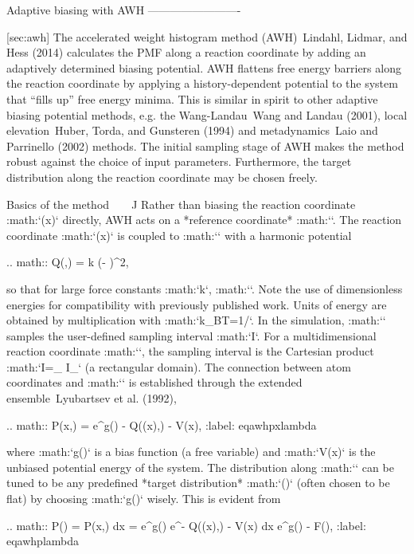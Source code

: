 Adaptive biasing with AWH
-------------------------

[sec:awh] The accelerated weight histogram method (AWH) Lindahl, Lidmar,
and Hess (2014) calculates the PMF along a reaction coordinate by adding
an adaptively determined biasing potential. AWH flattens free energy
barriers along the reaction coordinate by applying a history-dependent
potential to the system that “fills up” free energy minima. This is
similar in spirit to other adaptive biasing potential methods, e.g. the
Wang-Landau Wang and Landau (2001), local elevation Huber, Torda, and
Gunsteren (1994) and metadynamics Laio and Parrinello (2002) methods.
The initial sampling stage of AWH makes the method robust against the
choice of input parameters. Furthermore, the target distribution along
the reaction coordinate may be chosen freely.

Basics of the method
^^^^^^^^^^^^^^^^^^^^

Rather than biasing the reaction coordinate :math:`\xi(x)` directly, AWH
acts on a *reference coordinate* :math:`\lambda`. The reaction
coordinate :math:`\xi(x)` is coupled to :math:`\lambda` with a harmonic
potential

.. math:: Q(\xi,\lambda) =  \beta k (\xi - \lambda)^2,

so that for large force constants :math:`k`,
:math:`\xi \approx \lambda`. Note the use of dimensionless energies for
compatibility with previously published work. Units of energy are
obtained by multiplication with :math:`k_BT=1/\beta`. In the simulation,
:math:`\lambda` samples the user-defined sampling interval :math:`I`.
For a multidimensional reaction coordinate :math:`\xi`, the sampling
interval is the Cartesian product :math:`I=\Pi_{\mu} I_{\mu}` (a rectangular
domain). The connection between atom coordinates and :math:`\lambda` is
established through the extended ensemble Lyubartsev et al. (1992),

.. math:: P(x,\lambda) = e^{g(\lambda) - Q(\xi(x),\lambda) - V(x)},
          :label: eqawhpxlambda

where :math:`g(\lambda)` is a bias function (a free variable) and
:math:`V(x)` is the unbiased potential energy of the system. The
distribution along :math:`\lambda` can be tuned to be any predefined
*target distribution* :math:`\rho(\lambda)` (often chosen to be flat) by
choosing :math:`g(\lambda)` wisely. This is evident from

.. math:: P(\lambda) = \int P(x,\lambda)  dx = 
          e^{g(\lambda)} \int e^{- Q(\xi(x),\lambda) - V(x)}  dx 
          \equiv \frac{1}{\mathcal{Z}}e^{g(\lambda) - F(\lambda)},
          :label: eqawhplambda

